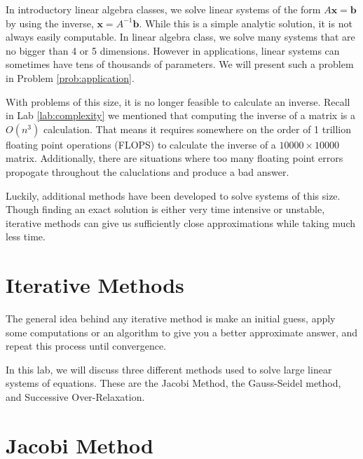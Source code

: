 \label{lab:iter_methods}


In introductory linear algebra classes, we solve linear systems of the form $A\mathbf{x} = \mathbf{b}$ by using the inverse, $\mathbf{x} = A^{-1}\mathbf{b}$. While this is a simple analytic solution, it is not always easily computable. In linear algebra class, we solve many systems that are no bigger than 4 or 5 dimensions. However in applications, linear systems can sometimes have tens of thousands of parameters. We will present such a problem in Problem \ref{prob:application}.

With problems of this size, it is no longer feasible to calculate an inverse. Recall in Lab \ref{lab:complexity} we mentioned that computing the inverse of a matrix is a $O(n^3)$ calculation. That means it requires somewhere on the order of 1 trillion floating point operations (FLOPS) to calculate the inverse of a $10000 \times 10000$ matrix. Additionally, there are situations where too many floating point errors propogate throughout the caluclations and produce a bad answer.

Luckily, additional methods have been developed to solve systems of this size. Though finding an exact solution is either very time intensive or unstable, iterative methods can give us sufficiently close approximations while taking much less time.

\section*{Iterative Methods}

The general idea behind any iterative method is make an initial guess, apply some computations or an algorithm to give you a better approximate answer, and repeat this process until convergence.

In this lab, we will discuss three different methods used to solve large linear systems of equations. These are the Jacobi Method, the Gauss-Seidel method, and Successive Over-Relaxation.

\section*{Jacobi Method}

